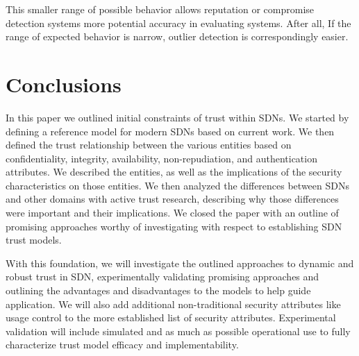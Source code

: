 \documentclass[10pt,conference]{IEEEtran}
\begin{document}
This smaller range of possible behavior allows reputation or compromise detection systems more potential accuracy in evaluating systems.  After all, If the range of expected behavior is narrow, outlier detection is correspondingly easier.

\section{Conclusions}
In this paper we outlined initial constraints of trust within SDNs.  We started by defining a reference model for modern SDNs based on current work.  We then defined the trust relationship between the various entities based on confidentiality, integrity, availability, non-repudiation, and authentication attributes.  We described the entities, as well as the implications of the security characteristics on those entities.  We then analyzed the differences between SDNs and other domains with active trust research, describing why those differences were important and their implications.  We closed the paper with an outline of promising approaches worthy of investigating with respect to establishing SDN trust models.

With this foundation, we will investigate the outlined approaches to dynamic and robust trust in SDN, experimentally validating promising approaches and outlining the advantages and disadvantages to the models to help guide application.  We will also add additional non-traditional security attributes like usage control to the more established list of security attributes.  Experimental validation will include simulated and as much as possible operational use to fully characterize trust model efficacy and implementability.

\printbibliography
\end{document}
